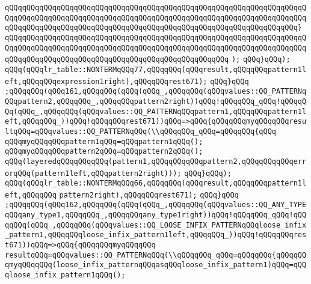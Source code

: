 \verb|qQQqqQQqqQQqqQQqqQQqqQQqqQQqqQQqqQQqqQQqqQQqqQQqqQQqqQQqqQQqqQQqqQQqqQQqqQQqqQQqqQQqqQQqqQQqqQQqqQQqqQQqqQQqqQQqqQQqqQQqqQQqqQQqqQQqqQQqqQQqqQQqqQQqqQQqqQQqqQQqqQQqqQQqqQQqqQQqqQQqqQQqqQQqqQQqqQQqqQQqqQQqqQQq}|\newline
\verb|qQQqqQQqqQQqqQQqqQQqqQQqqQQqqQQqqQQqqQQqqQQqqQQqqQQqqQQqqQQqqQQqqQQqqQQqqQQqqQQqqQQqqQQqqQQqqQQqqQQqqQQqqQQqqQQqqQQqqQQqqQQqqQQqqQQqqQQqqQQqqQQqqQQqqQQqqQQqqQQqqQQqqQQqqQQqqQQqqQQqqQQqqQQqqQQq|\newline
\verb|);|\newline
\verb|qQQq}qQQq);|\newline
\verb|qQQq(qQQqlr_table::NONTERMqQQq77,qQQqqQQq(qQQqresult,qQQqqQQqpattern1left,qQQqqQQqexpression1right),qQQqqQQqrest671);|\newline
\verb|qQQq}qQQq|\newline
\verb|;qQQqqQQq(qQQq161,qQQqqQQq(qQQq(qQQq_,qQQqqQQq(qQQqvalues::QQ_PATTERNqQQqpattern2,qQQqqQQq_,qQQqqQQqpattern2right))qQQq!qQQqqQQq_qQQq!qQQqqQQq(qQQq_,qQQqqQQq(qQQqvalues::QQ_PATTERNqQQqpattern1,qQQqqQQqpattern1left,qQQqqQQq_))qQQq!qQQqqQQqrest671))qQQq=>qQQq{qQQqqQQqmyqQQqqQQqresultqQQq=qQQqvalues::QQ_PATTERNqQQq(\\qQQqqQQq_qQQq=qQQqqQQq{qQQq|\newline
\verb|qQQqmyqQQqqQQqpattern1qQQq=qQQqpattern1qQQq();|\newline
\verb|qQQqmyqQQqqQQqpattern2qQQq=qQQqpattern2qQQq();|\newline
\verb|qQQq(layeredqQQqqQQqqQQq(pattern1,qQQqqQQqqQQqpattern2,qQQqqQQqqQQqerrorqQQq(pattern1left,qQQqpattern2right)));|\newline
\verb|qQQq}qQQq);|\newline
\verb|qQQq(qQQqlr_table::NONTERMqQQq66,qQQqqQQq(qQQqresult,qQQqqQQqpattern1left,qQQqqQQq|\newline
\verb|pattern2right),qQQqqQQqrest671);|\newline
\verb|qQQq}qQQq|\newline
\verb|;qQQqqQQq(qQQq162,qQQqqQQq(qQQq(qQQq_,qQQqqQQq(qQQqvalues::QQ_ANY_TYPEqQQqany_type1,qQQqqQQq_,qQQqqQQqany_type1right))qQQq!qQQqqQQq_qQQq!qQQqqQQq(qQQq_,qQQqqQQq(qQQqvalues::QQ_LOOSE_INFIX_PATTERNqQQqloose_infix_pattern1,qQQqqQQqloose_infix_pattern1left,qQQqqQQq_))qQQq!qQQqqQQqrest671))qQQq=>qQQq{qQQqqQQqmyqQQqqQQq|\newline
\verb|resultqQQq=qQQqvalues::QQ_PATTERNqQQq(\\qQQqqQQq_qQQq=qQQqqQQq{qQQqqQQqmyqQQqqQQq(loose_infix_patternqQQqasqQQqloose_infix_pattern1)qQQq=qQQqloose_infix_pattern1qQQq();|\newline
